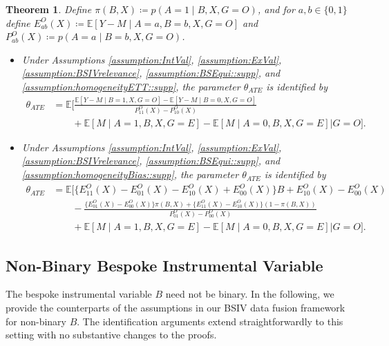 \documentclass[10pt]{article}
\newtheorem{theorem}{Theorem}
\newcommand{\E}{\mathbb{E}}
\begin{document}
\begin{theorem}
\label{thm:BSIV_ATE}
Define $\pi(B,X) \coloneqq p(A=1 \mid B,X,G=O)$, and for $a,b\in\{0,1\}$ define $E_{ab}^O(X)\coloneqq\E[Y-M\mid A=a,B=b,X,G=O]$ and $P_{ab}^O(X)\coloneqq p(A=a\mid B=b,X,G=O)$.	
\begin{itemize}
\item[(a)]
Under Assumptions \ref{assumption:IntVal}, \ref{assumption:ExVal},\ref{assumption:BSIVrelevance}, \ref{assumption:BSEqui::supp}, and \ref{assumption:homogeneityETT::supp}, the parameter $\theta_{ATE}$ is identified by
\begin{align*}
\theta_{ATE}
&=\E\Big[
\frac{\E[Y-M\mid B=1,X,G=O]-\E[Y-M\mid B=0,X,G=O]}{P_{11}^O(X)-P_{10}^O(X)}\\
&\qquad+\E[M\mid A=1,B,X,G=E]-\E[M\mid A=0,B,X,G=E]\Big|G=O\Big].
\end{align*}
\item[(b)]
Under Assumptions \ref{assumption:IntVal}, \ref{assumption:ExVal},\ref{assumption:BSIVrelevance}, \ref{assumption:BSEqui::supp}, and  \ref{assumption:homogeneityBias::supp}, the parameter $\theta_{ATE}$ is identified by
\begin{align*}
\theta_{ATE}
&=\E\Big[
\{E_{11}^O(X)-E_{01}^O(X)-E_{10}^O(X)+E_{00}^O(X)\}B+E_{10}^O(X)-E_{00}^O(X)\\
&\qquad-\frac{\{E_{01}^O(X)-E_{00}^O(X)\}\pi(B,X)+\{E_{11}^O(X)-E_{10}^O(X)\}(1-\pi(B,X))}{P_{01}^O(X)-P_{00}^O(X)}\\
&\qquad+\E[M\mid A=1,B,X,G=E]-\E[M\mid A=0,B,X,G=E]\Big|G=O\Big].
\end{align*}
\end{itemize}
\end{theorem}


\subsection{Non-Binary Bespoke Instrumental Variable}

The bespoke instrumental variable \( B \) need not be binary. In the following, we provide the counterparts of the assumptions in our BSIV data fusion framework for non-binary \( B \). The identification arguments extend straightforwardly to this setting with no substantive changes to the proofs.
\end{document}
